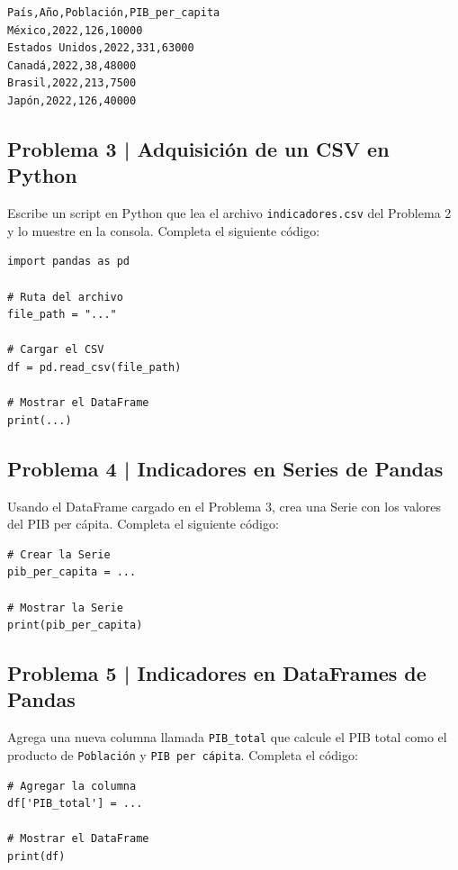 \documentclass{article}
\begin{document}
\begin{verbatim}
País,Año,Población,PIB_per_capita
México,2022,126,10000
Estados Unidos,2022,331,63000
Canadá,2022,38,48000
Brasil,2022,213,7500
Japón,2022,126,40000
\end{verbatim}

\clearpage

\subsection*{Problema 3 | Adquisición de un CSV en Python}

Escribe un script en Python que lea el archivo \texttt{indicadores.csv} del Problema 2 y lo muestre en la consola. Completa el siguiente código:

\begin{lstlisting}[style=python]
import pandas as pd

# Ruta del archivo
file_path = "..."

# Cargar el CSV
df = pd.read_csv(file_path)

# Mostrar el DataFrame
print(...)
\end{lstlisting}

\clearpage

\subsection*{Problema 4 | Indicadores en Series de Pandas}

Usando el DataFrame cargado en el Problema 3, crea una Serie con los valores del PIB per cápita. Completa el siguiente código:

\begin{lstlisting}[style=python]
# Crear la Serie
pib_per_capita = ...

# Mostrar la Serie
print(pib_per_capita)
\end{lstlisting}

\clearpage

\subsection*{Problema 5 | Indicadores en DataFrames de Pandas}

Agrega una nueva columna llamada \texttt{PIB\_total} que calcule el PIB total como el producto de \texttt{Población} y \texttt{PIB per cápita}. Completa el código:

\begin{lstlisting}[style=python]
# Agregar la columna
df['PIB_total'] = ...

# Mostrar el DataFrame
print(df)
\end{lstlisting}
\end{document}
